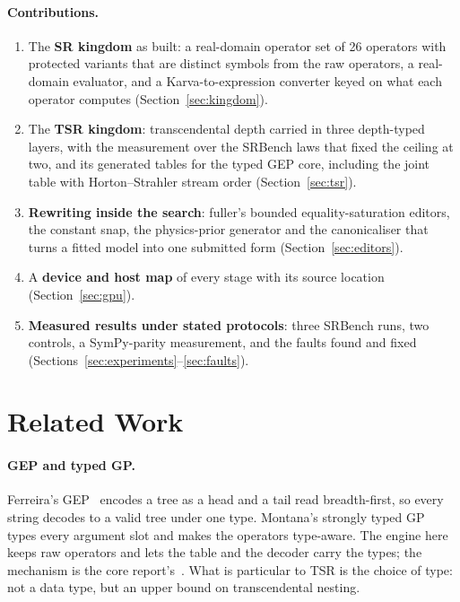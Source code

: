 \documentclass[sigconf,nonacm]{acmart}
\begin{document}
\paragraph{Contributions.}
\begin{enumerate}
\item The \textbf{SR kingdom} as built: a real-domain operator set of 26
operators with protected variants that are distinct symbols from the raw
operators, a real-domain evaluator, and a Karva-to-expression converter keyed
on what each operator computes (Section~\ref{sec:kingdom}).
\item The \textbf{TSR kingdom}: transcendental depth carried in three
depth-typed layers, with the measurement over the SRBench laws that fixed the
ceiling at two, and its generated tables for the typed GEP core, including the
joint table with Horton--Strahler stream order
(Section~\ref{sec:tsr}).
\item \textbf{Rewriting inside the search}: fuller's bounded equality-saturation
editors, the constant snap, the physics-prior generator and the canonicaliser
that turns a fitted model into one submitted form
(Section~\ref{sec:editors}).
\item A \textbf{device and host map} of every stage with its source location
(Section~\ref{sec:gpu}).
\item \textbf{Measured results under stated protocols}: three SRBench runs, two
controls, a SymPy-parity measurement, and the faults found and fixed
(Sections~\ref{sec:experiments}--\ref{sec:faults}).
\end{enumerate}

\section{Related Work}
\label{sec:related}

\paragraph{GEP and typed GP.} Ferreira's GEP~\cite{ferreira2001gep} encodes a
tree as a head and a tail read breadth-first, so every string decodes to a
valid tree under one type. Montana's strongly typed GP~\cite{montana1995stgp}
types every argument slot and makes the operators type-aware. The engine here
keeps raw operators and lets the table and the decoder carry the types; the
mechanism is the core report's~\cite{morgan_core}. What is particular to TSR is
the choice of type: not a data type, but an upper bound on transcendental
nesting.
\end{document}
